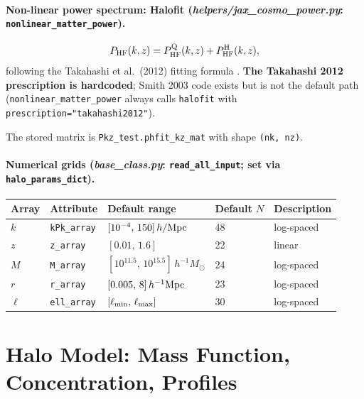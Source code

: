 \documentclass[12pt,a4paper]{article}
\newcommand{\code}[1]{\texttt{\small #1}}
\newcommand{\param}[1]{\texttt{\small #1}}
\newcommand{\file}[1]{\textit{\small #1}}
\begin{document}
\paragraph{Non-linear power spectrum: Halofit (\file{helpers/jax\_cosmo\_power.py}: \code{nonlinear\_matter\_power}).}
\begin{equation}
  P_{\rm HF}(k,z) = P_{\rm HF}^{\rm Q}(k,z) + P_{\rm HF}^{\rm H}(k,z),
\end{equation}
following the Takahashi et al.\ (2012) fitting formula \citep{Takahashi2012}.
\textbf{The Takahashi 2012 prescription is hardcoded}; Smith 2003 code exists but is not
the default path (\code{nonlinear\_matter\_power} always calls \code{halofit} with
\code{prescription="takahashi2012"}).

The stored matrix is \code{Pkz\_test.phfit\_kz\_mat} with shape
\code{(nk, nz)}.

\paragraph{Numerical grids (\file{base\_class.py}: \code{read\_all\_input}; set via \param{halo\_params\_dict}).}

\begin{center}
\begin{tabular}{lllll}
\toprule
Array & Attribute & Default range & Default $N$ & Description \\
\midrule
$k$ & \code{kPk\_array} & $[10^{-4},\,150]\,h/{\rm Mpc}$ & 48 & log-spaced \\
$z$ & \code{z\_array} & $[0.01,\,1.6]$ & 22 & linear \\
$M$ & \code{M\_array} & $[10^{11.5},\,10^{15.5}]\,h^{-1}M_\odot$ & 24 & log-spaced \\
$r$ & \code{r\_array} & $[0.005,\,8]\,h^{-1}{\rm Mpc}$ & 23 & log-spaced \\
$\ell$ & \code{ell\_array} & $[\ell_{\rm min},\,\ell_{\rm max}]$ & 30 & log-spaced \\
\bottomrule
\end{tabular}
\end{center}

\section{Halo Model: Mass Function, Concentration, Profiles}
\label{sec:halomodel}
\end{document}
